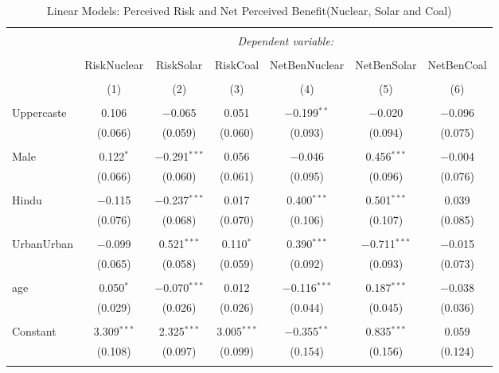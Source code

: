 \documentclass[
]{article}
\begin{document}
\begin{landscape}
\begin{table}[!htbp] \centering 
  \caption{Linear Models: Perceived Risk and Net Perceived Benefit(Nuclear, Solar and Coal)} 
  \label{} 
\begin{tabular}{@{\extracolsep{5pt}}lcccccc} 
\\[-1.8ex]\hline 
\hline \\[-1.8ex] 
 & \multicolumn{6}{c}{\textit{Dependent variable:}} \\ 
\cline{2-7} 
\\[-1.8ex] & RiskNuclear & RiskSolar & RiskCoal & NetBenNuclear & NetBenSolar & NetBenCoal \\ 
\\[-1.8ex] & (1) & (2) & (3) & (4) & (5) & (6)\\ 
\hline \\[-1.8ex] 
 Uppercaste & 0.106 & $-$0.065 & 0.051 & $-$0.199$^{**}$ & $-$0.020 & $-$0.096 \\ 
  & (0.066) & (0.059) & (0.060) & (0.093) & (0.094) & (0.075) \\ 
  & & & & & & \\ 
 Male & 0.122$^{*}$ & $-$0.291$^{***}$ & 0.056 & $-$0.046 & 0.456$^{***}$ & $-$0.004 \\ 
  & (0.066) & (0.060) & (0.061) & (0.095) & (0.096) & (0.076) \\ 
  & & & & & & \\ 
 Hindu & $-$0.115 & $-$0.237$^{***}$ & 0.017 & 0.400$^{***}$ & 0.501$^{***}$ & 0.039 \\ 
  & (0.076) & (0.068) & (0.070) & (0.106) & (0.107) & (0.085) \\ 
  & & & & & & \\ 
 UrbanUrban & $-$0.099 & 0.521$^{***}$ & 0.110$^{*}$ & 0.390$^{***}$ & $-$0.711$^{***}$ & $-$0.015 \\ 
  & (0.065) & (0.058) & (0.059) & (0.092) & (0.093) & (0.073) \\ 
  & & & & & & \\ 
 age & 0.050$^{*}$ & $-$0.070$^{***}$ & 0.012 & $-$0.116$^{***}$ & 0.187$^{***}$ & $-$0.038 \\ 
  & (0.029) & (0.026) & (0.026) & (0.044) & (0.045) & (0.036) \\ 
  & & & & & & \\ 
 Constant & 3.309$^{***}$ & 2.325$^{***}$ & 3.005$^{***}$ & $-$0.355$^{**}$ & 0.835$^{***}$ & 0.059 \\ 
  & (0.108) & (0.097) & (0.099) & (0.154) & (0.156) & (0.124) \\ 
  & & & & & & \\ 

\end{tabular}
\end{table}
\end{landscape}
\end{document}
